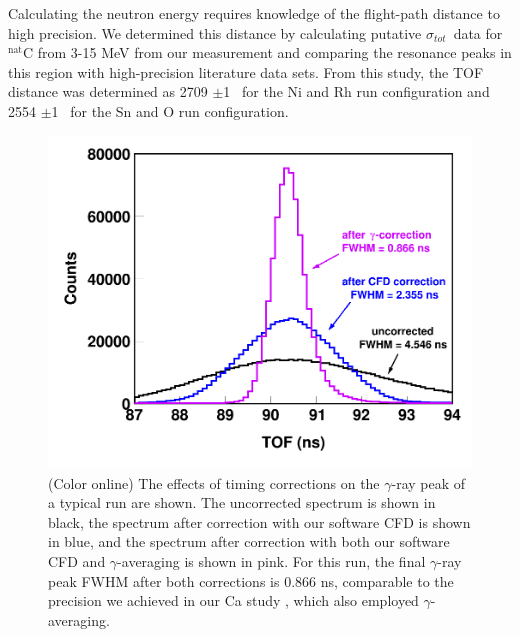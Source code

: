 \documentclass[twocolumn,secnumarabic,amssymb, nobibnotes, aps, prl,
superscriptaddress, nobalancelastpage]{revtex4}
\newcommand{\tot}{\ensuremath{\sigma_{tot}}}
\begin{document}
Calculating the neutron energy requires knowledge of the flight-path
distance to high precision. We determined this distance by calculating 
putative \tot\ data for $^{\text{nat}}$C from 3-15 MeV from our measurement and 
comparing the resonance peaks in this region with high-precision literature data
sets. From this study, the TOF distance was determined as 2709 $\pm$1
\centi\meter\ for the Ni and Rh run configuration and 2554
$\pm$1 \centi\meter\ for the Sn and O run configuration.
\begin{figure}
    \includegraphics[width=\linewidth]{figures/TimeCorrections.png}
    \caption{(Color online) The effects of timing corrections on the $\gamma$-ray
        peak of a typical run are shown. The uncorrected spectrum is shown in black,
        the spectrum after correction with our software CFD is shown in blue,
        and the spectrum after correction with both our software CFD and
        $\gamma$-averaging is 
        shown in pink. For this run, the final $\gamma$-ray peak 
        FWHM after both corrections is 0.866 ns, comparable to the precision we
        achieved in our Ca study \cite{Shane2010}, which also employed $\gamma$-
        averaging.}
    \label{TimingCorrectionStudy}
\end{figure}
\end{document}
